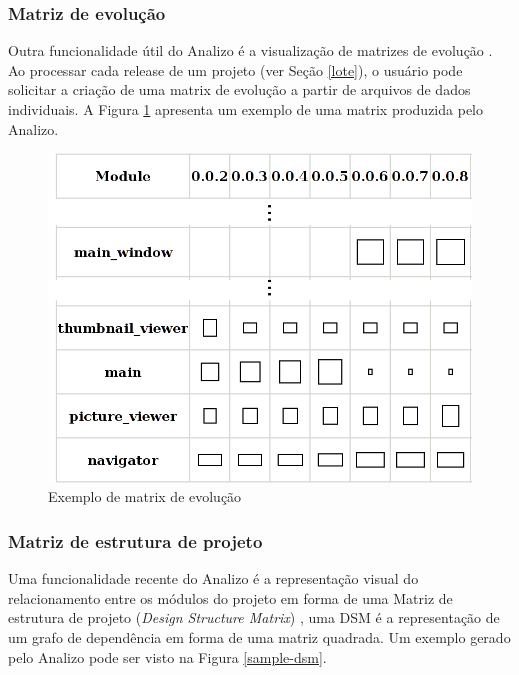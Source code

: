 \subsubsection{Matriz de evolução}

Outra funcionalidade útil do Analizo é a visualização de matrizes de evolução
\cite{Lanza2001}. Ao processar cada release de um projeto (ver Seção
\ref{lote}), o usuário pode solicitar a criação de uma matrix de evolução a
partir de arquivos de dados individuais. A Figura \ref{sample-evolution-matrix}
apresenta um exemplo de uma matrix produzida pelo Analizo.

\begin{figure}[h]
\center
\includegraphics[scale=0.2]{imagens/sample-evolution-matrix.png}
\caption{Exemplo de matrix de evolução}
\label{sample-evolution-matrix}
\end{figure}

\subsubsection{Matriz de estrutura de projeto}

Uma funcionalidade recente do Analizo é a representação visual do
relacionamento entre os módulos do projeto em forma de uma Matriz de estrutura
de projeto ({\it Design Structure Matrix}) \cite{Maccormack2006}, uma DSM é a
representação de um grafo de dependência em forma de uma matriz quadrada. Um
exemplo gerado pelo Analizo pode ser visto na Figura \ref{sample-dsm}.

